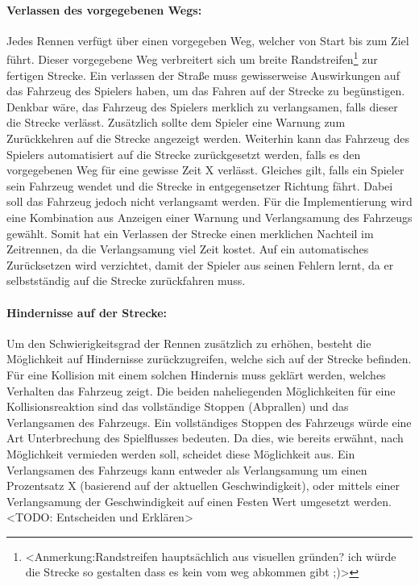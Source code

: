 		\paragraph{Verlassen des vorgegebenen Wegs:}
		Jedes Rennen verfügt über einen vorgegeben Weg, welcher von Start bis zum Ziel führt. Dieser vorgegebene Weg verbreitert sich um breite Randstreifen\footnote{<Anmerkung:Randstreifen hauptsächlich aus visuellen gründen? ich würde die Strecke so gestalten dass es kein vom weg abkommen gibt ;)>} zur fertigen Strecke. Ein verlassen der Straße muss gewisserweise Auswirkungen auf das Fahrzeug des Spielers haben, um das Fahren auf der Strecke zu begünstigen. Denkbar wäre, das Fahrzeug des Spielers merklich zu verlangsamen, falls dieser die Strecke verlässt. Zusätzlich sollte dem Spieler eine Warnung zum Zurückkehren auf die Strecke angezeigt werden. Weiterhin kann das Fahrzeug des Spielers automatisiert auf die Strecke zurückgesetzt werden, falls es den vorgegebenen Weg für eine gewisse Zeit X verlässt. Gleiches gilt, falls ein Spieler sein Fahrzeug wendet und die Strecke in entgegensetzer Richtung fährt. Dabei soll das Fahrzeug jedoch nicht verlangsamt werden. Für die Implementierung wird eine Kombination aus Anzeigen einer Warnung und Verlangsamung des Fahrzeugs gewählt. Somit hat ein Verlassen der Strecke einen merklichen Nachteil im Zeitrennen, da die Verlangsamung viel Zeit kostet. Auf ein automatisches Zurücksetzen wird verzichtet, damit der Spieler aus seinen Fehlern lernt, da er selbstständig auf die Strecke zurückfahren muss.

		\paragraph{Hindernisse auf der Strecke:}
		Um den Schwierigkeitsgrad der Rennen zusätzlich zu erhöhen, besteht die Möglichkeit auf Hindernisse zurückzugreifen, welche sich auf der Strecke befinden. Für eine Kollision mit einem solchen Hindernis muss geklärt werden, welches Verhalten das Fahrzeug zeigt. Die beiden naheliegenden Möglichkeiten für eine Kollisionsreaktion sind das vollständige Stoppen (Abprallen) und das Verlangsamen des Fahrzeugs.
		Ein vollständiges Stoppen des Fahrzeugs würde eine Art Unterbrechung des Spielflusses bedeuten. Da dies, wie bereits erwähnt, nach Möglichkeit vermieden werden soll, scheidet diese Möglichkeit aus. Ein Verlangsamen des Fahrzeugs kann entweder als Verlangsamung um einen Prozentsatz X (basierend auf der aktuellen Geschwindigkeit), oder mittels einer Verlangsamung der Geschwindigkeit auf einen Festen Wert umgesetzt werden. <TODO: Entscheiden und Erklären>

